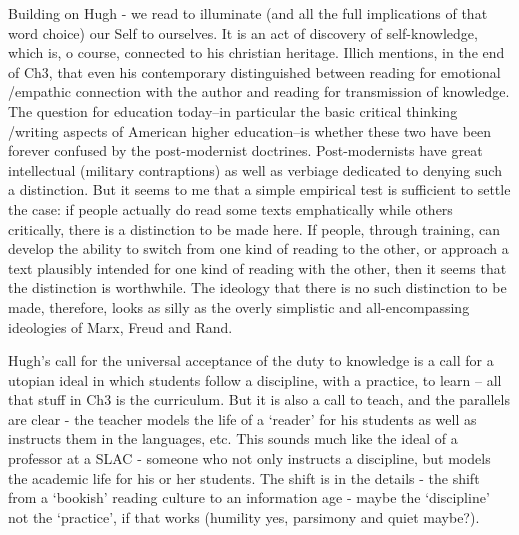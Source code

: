 Building on Hugh - we read to illuminate (and all the full implications of that word choice) our Self to ourselves. It is an act of discovery of self-knowledge, which is, o course, connected to his christian heritage.
Illich mentions, in the end of Ch3, that even his contemporary distinguished between reading for emotional \slash  empathic connection with the author and reading for transmission of knowledge. The question for education today--in particular the basic critical thinking \slash  writing aspects of American higher education--is whether these two have been forever confused by the post-modernist doctrines. Post-modernists have great intellectual (military contraptions) as well as verbiage dedicated to denying such a distinction. But it seems to me that a simple empirical test is sufficient to settle the case: if people actually do read some texts emphatically while others critically, there is a distinction to be made here. If people, through training, can develop the ability to switch from one kind of reading to the other, or approach a text plausibly intended for one kind of reading with the other, then it seems that the distinction is worthwhile. The ideology that there is no such distinction to be made, therefore, looks as silly as the overly simplistic and all-encompassing ideologies of Marx, Freud and Rand. 

Hugh's call for the universal acceptance of the duty to knowledge is a call for a utopian ideal in which students follow a discipline, with a practice, to learn -- all that stuff in Ch3 is the curriculum. But it is also a call to teach, and the parallels are clear - the teacher models the life of a `reader' for his students as well as instructs them in the languages, etc. This sounds much like the ideal of a professor at a SLAC - someone who not only instructs a discipline, but models the academic life for his or her students.
The shift is in the details - the shift from a `bookish' reading culture to an information age - maybe the `discipline' not the `practice', if that works (humility yes, parsimony and quiet maybe?).

